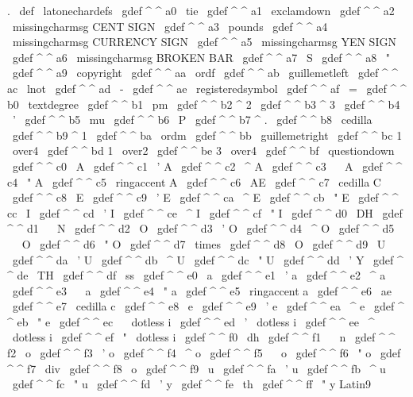 {{{{.
\
def
\
latonechardefs
{
%
\
gdef
^
^
a0
{
\
tie
}
\
gdef
^
^
a1
{
\
exclamdown
}
\
gdef
^
^
a2
{
\
missingcharmsg
{
CENT
SIGN
}
}
\
gdef
^
^
a3
{
{
\
pounds
}
}
\
gdef
^
^
a4
{
\
missingcharmsg
{
CURRENCY
SIGN
}
}
\
gdef
^
^
a5
{
\
missingcharmsg
{
YEN
SIGN
}
}
\
gdef
^
^
a6
{
\
missingcharmsg
{
BROKEN
BAR
}
}
\
gdef
^
^
a7
{
\
S
}
\
gdef
^
^
a8
{
\
"
{
}
}
\
gdef
^
^
a9
{
\
copyright
}
\
gdef
^
^
aa
{
\
ordf
}
\
gdef
^
^
ab
{
\
guillemetleft
}
\
gdef
^
^
ac
{
\
lnot
}
\
gdef
^
^
ad
{
\
-
}
\
gdef
^
^
ae
{
\
registeredsymbol
}
\
gdef
^
^
af
{
\
=
{
}
}
%
\
gdef
^
^
b0
{
\
textdegree
}
\
gdef
^
^
b1
{
\
pm
}
\
gdef
^
^
b2
{
^
2
}
\
gdef
^
^
b3
{
^
3
}
\
gdef
^
^
b4
{
\
'
{
}
}
\
gdef
^
^
b5
{
\
mu
}
\
gdef
^
^
b6
{
\
P
}
%
\
gdef
^
^
b7
{
^
.
}
\
gdef
^
^
b8
{
\
cedilla
\
}
\
gdef
^
^
b9
{
^
1
}
\
gdef
^
^
ba
{
\
ordm
}
%
\
gdef
^
^
bb
{
\
guillemetright
}
\
gdef
^
^
bc
{
1
\
over4
}
\
gdef
^
^
bd
{
1
\
over2
}
\
gdef
^
^
be
{
3
\
over4
}
\
gdef
^
^
bf
{
\
questiondown
}
%
\
gdef
^
^
c0
{
\
A
}
\
gdef
^
^
c1
{
\
'
A
}
\
gdef
^
^
c2
{
\
^
A
}
\
gdef
^
^
c3
{
\
~
A
}
\
gdef
^
^
c4
{
\
"
A
}
\
gdef
^
^
c5
{
\
ringaccent
A
}
\
gdef
^
^
c6
{
\
AE
}
\
gdef
^
^
c7
{
\
cedilla
C
}
\
gdef
^
^
c8
{
\
E
}
\
gdef
^
^
c9
{
\
'
E
}
\
gdef
^
^
ca
{
\
^
E
}
\
gdef
^
^
cb
{
\
"
E
}
\
gdef
^
^
cc
{
\
I
}
\
gdef
^
^
cd
{
\
'
I
}
\
gdef
^
^
ce
{
\
^
I
}
\
gdef
^
^
cf
{
\
"
I
}
%
\
gdef
^
^
d0
{
\
DH
}
\
gdef
^
^
d1
{
\
~
N
}
\
gdef
^
^
d2
{
\
O
}
\
gdef
^
^
d3
{
\
'
O
}
\
gdef
^
^
d4
{
\
^
O
}
\
gdef
^
^
d5
{
\
~
O
}
\
gdef
^
^
d6
{
\
"
O
}
\
gdef
^
^
d7
{
\
times
}
\
gdef
^
^
d8
{
\
O
}
\
gdef
^
^
d9
{
\
U
}
\
gdef
^
^
da
{
\
'
U
}
\
gdef
^
^
db
{
\
^
U
}
\
gdef
^
^
dc
{
\
"
U
}
\
gdef
^
^
dd
{
\
'
Y
}
\
gdef
^
^
de
{
\
TH
}
\
gdef
^
^
df
{
\
ss
}
%
\
gdef
^
^
e0
{
\
a
}
\
gdef
^
^
e1
{
\
'
a
}
\
gdef
^
^
e2
{
\
^
a
}
\
gdef
^
^
e3
{
\
~
a
}
\
gdef
^
^
e4
{
\
"
a
}
\
gdef
^
^
e5
{
\
ringaccent
a
}
\
gdef
^
^
e6
{
\
ae
}
\
gdef
^
^
e7
{
\
cedilla
c
}
\
gdef
^
^
e8
{
\
e
}
\
gdef
^
^
e9
{
\
'
e
}
\
gdef
^
^
ea
{
\
^
e
}
\
gdef
^
^
eb
{
\
"
e
}
\
gdef
^
^
ec
{
\
{
\
dotless
i
}
}
\
gdef
^
^
ed
{
\
'
{
\
dotless
i
}
}
\
gdef
^
^
ee
{
\
^
{
\
dotless
i
}
}
\
gdef
^
^
ef
{
\
"
{
\
dotless
i
}
}
%
\
gdef
^
^
f0
{
\
dh
}
\
gdef
^
^
f1
{
\
~
n
}
\
gdef
^
^
f2
{
\
o
}
\
gdef
^
^
f3
{
\
'
o
}
\
gdef
^
^
f4
{
\
^
o
}
\
gdef
^
^
f5
{
\
~
o
}
\
gdef
^
^
f6
{
\
"
o
}
\
gdef
^
^
f7
{
\
div
}
\
gdef
^
^
f8
{
\
o
}
\
gdef
^
^
f9
{
\
u
}
\
gdef
^
^
fa
{
\
'
u
}
\
gdef
^
^
fb
{
\
^
u
}
\
gdef
^
^
fc
{
\
"
u
}
\
gdef
^
^
fd
{
\
'
y
}
\
gdef
^
^
fe
{
\
th
}
\
gdef
^
^
ff
{
\
"
y
}
}
%
Latin9
}}}}
